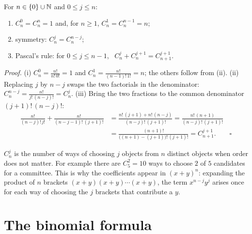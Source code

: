 \begin{proposition}
For $n\in\{0\}\cup\mathbb{N}$ and $0\le j\le n$:
\begin{enumerate}[label=(\roman*)]
  \item $C_n^0=C_n^n=1$ and, for $n\ge1$, $C_n^1=C_n^{n-1}=n$;
  \item symmetry: $C_n^j=C_n^{n-j}$;
  \item Pascal's rule: for $0\le j\le n-1$, \ $C_n^{j}+C_n^{j+1}=C_{n+1}^{j+1}$.
\end{enumerate}
\end{proposition}
\emph{Proof.} (i) $C_n^0=\frac{n!}{n!\,0!}=1$ and $C_n^1=\frac{n!}{(n-1)!\,1!}=n$; the others follow from (ii).
(ii) Replacing $j$ by $n-j$ swaps the two factorials in the denominator: $C_n^{n-j}=\frac{n!}{j!\,(n-j)!}=C_n^j$.
(iii) Bring the two fractions to the common denominator $(j+1)!\,(n-j)!$:
\begin{align*}
\frac{n!}{(n-j)!\,j!}+\frac{n!}{(n-j-1)!\,(j+1)!}
&=\frac{n!\,(j+1)+n!\,(n-j)}{(n-j)!\,(j+1)!}=\frac{n!\,(n+1)}{(n-j)!\,(j+1)!}\\
&=\frac{(n+1)!}{\big((n+1)-(j+1)\big)!\,(j+1)!}=C_{n+1}^{j+1}. \qquad\square
\end{align*}

\begin{external}
$C_n^j$ is the number of ways of choosing $j$ objects from $n$ distinct objects when order does not matter. For example
there are $C_5^2=10$ ways to choose $2$ of $5$ candidates for a committee. This is why the coefficients appear in
$(x+y)^n$: expanding the product of $n$ brackets $(x+y)(x+y)\cdots(x+y)$, the term $x^{n-j}y^j$ arises once for each way of
choosing the $j$ brackets that contribute a $y$.
\end{external}

\section{The binomial formula}\label{sec:binom-formula}

